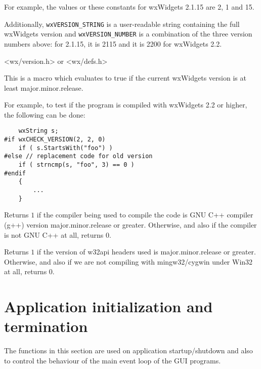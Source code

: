 For example, the values or these constants for wxWidgets 2.1.15 are 2, 1 and
15.

Additionally, {\tt wxVERSION\_STRING} is a user-readable string containing
the full wxWidgets version and {\tt wxVERSION\_NUMBER} is a combination of the
three version numbers above: for 2.1.15, it is 2115 and it is 2200 for
wxWidgets 2.2.


<wx/version.h> or <wx/defs.h>


\label{wxcheckversion}


This is a macro which evaluates to true if the current wxWidgets version is at
least major.minor.release.

For example, to test if the program is compiled with wxWidgets 2.2 or higher,
the following can be done:

\begin{verbatim}
    wxString s;
#if wxCHECK_VERSION(2, 2, 0)
    if ( s.StartsWith("foo") )
#else // replacement code for old version
    if ( strncmp(s, "foo", 3) == 0 )
#endif
    {
        ...
    }
\end{verbatim}


\label{wxcheckgccversion}


Returns $1$ if the compiler being used to compile the code is GNU C++
compiler (g++) version major.minor.release or greater. Otherwise, and also if
the compiler is not GNU C++ at all, returns $0$.


\label{wxcheckw32apiversion}


Returns $1$ if the version of w32api headers used is major.minor.release or
greater. Otherwise, and also if we are not compiling with mingw32/cygwin under
Win32 at all, returns $0$.



\section{Application initialization and termination}\label{appinifunctions}

The functions in this section are used on application startup/shutdown and also
to control the behaviour of the main event loop of the GUI programs.


